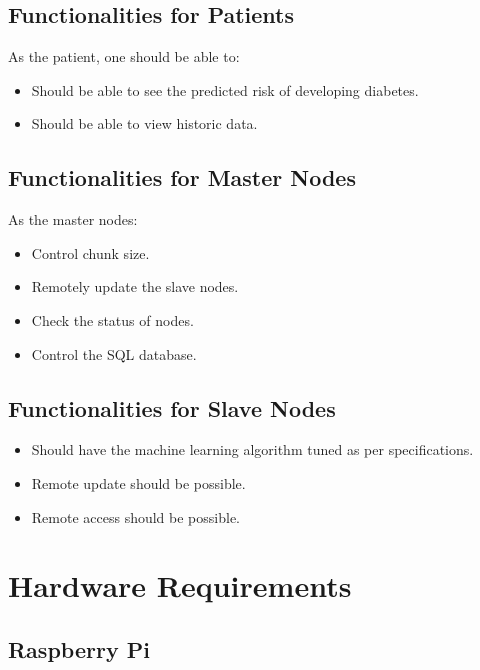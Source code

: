 \documentclass[12pt]{article}
\begin{document}
\subsection{Functionalities for Patients}
As the patient, one should be able to:
\begin{itemize}
\item Should be able to see the predicted risk of developing diabetes.
\item Should be able to view historic data.
\end{itemize}

\subsection{Functionalities for Master Nodes}
As the master nodes:
\begin{itemize}
\item Control chunk size.
\item Remotely update the slave nodes.
\item Check the status of nodes.
\item Control the SQL database.
\end{itemize}

\subsection{Functionalities for Slave Nodes}
\begin{itemize}
\item Should have the machine learning algorithm tuned as per specifications.
\item Remote update should be possible.
\item Remote access should be possible.
\end{itemize}

\newpage
\section{Hardware Requirements}
\subsection{Raspberry Pi}
\end{document}
